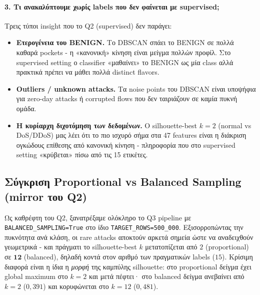\documentclass[12pt,a4paper,twoside]{book}
\begin{document}
\paragraph{3. Τι ανακαλύπτουμε χωρίς labels που δεν φαίνεται με supervised;}
Τρεις τύποι insight που το Q2 (supervised) δεν παράγει:
\begin{itemize}
    \item \textbf{Ετερογένεια του BENIGN.} Το DBSCAN σπάει το BENIGN σε
    πολλά καθαρά pockets - η «κανονική» κίνηση είναι μείγμα πολλών προφίλ.
    Στο supervised setting ο classifier «μαθαίνει» το BENIGN ως μία class
    αλλά πρακτικά πρέπει να μάθει πολλά distinct flavors.
    \item \textbf{Outliers / unknown attacks.} Τα noise points του DBSCAN
    είναι υποψήφια για zero-day attacks ή corrupted flows που δεν ταιριάζουν
    σε καμία πυκνή ομάδα.
    \item \textbf{Η κυρίαρχη διχοτόμηση των δεδομένων.} Ο silhouette-best
    \(k=2\) (normal vs DoS/DDoS) μας λέει ότι το πιο ισχυρό σήμα στα 47
    features είναι η διάκριση ογκώδους επίθεσης από κανονική κίνηση -
    πληροφορία που στο supervised setting «κρύβεται» πίσω από τις 15 ετικέτες.
\end{itemize}

\subsection{Σύγκριση Proportional vs Balanced Sampling (mirror του Q2)}\label{sec:q3_sampling_comparison}

Ως καθρέφτη του Q2, ξανατρέξαμε ολόκληρο το Q3 pipeline με
\texttt{BALANCED\_SAMPLING=True} στο ίδιο \texttt{TARGET\_ROWS=500\_000}.
Εξισορροπώντας την πυκνότητα ανά κλάση, οι rare attacks αποκτούν αρκετά
σημεία ώστε να αναδειχθούν γεωμετρικά - και πράγματι το silhouette-best
\(k\) μετατοπίζεται από \(2\) (proportional) σε \(\mathbf{12}\) (balanced),
δηλαδή κοντά στον αριθμό των πραγματικών labels (\(15\)). Κρίσιμη διαφορά
είναι η ίδια η \emph{μορφή} της καμπύλης silhouette: στο proportional δείγμα
έχει global maximum στο \(k=2\) και μετά πέφτει· στο balanced δείγμα
ανεβαίνει από \(k=2\) (\(0{,}391\)) και κορυφώνεται στο \(k=12\)
(\(0{,}481\)).
\end{document}
